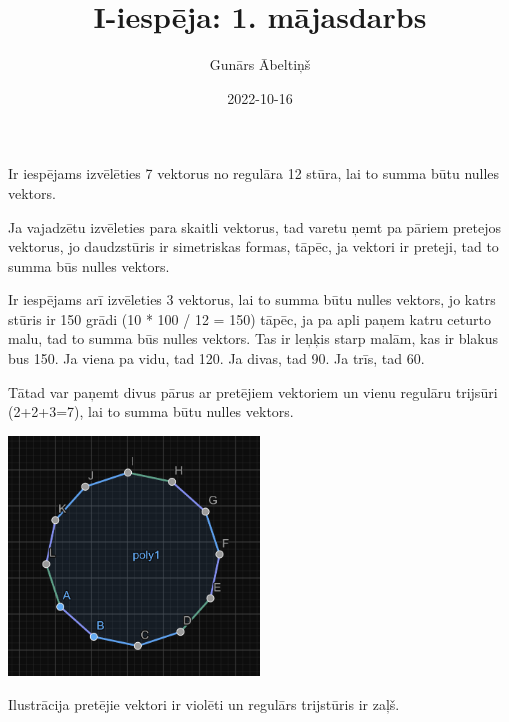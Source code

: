 \documentclass{article}
\title{I-iespēja: 1. mājasdarbs}
\author{Gunārs Ābeltiņš}
\date{2022-10-16}
\begin{document}
\maketitle

Ir iespējams izvēlēties 7 vektorus no regulāra 12 stūra, lai to summa būtu nulles vektors. 

Ja vajadzētu izvēleties para skaitli vektorus, tad varetu ņemt pa pāriem pretejos vektorus, jo daudzstūris ir simetriskas formas, tāpēc, ja vektori ir preteji, tad to summa būs nulles vektors.

Ir iespējams arī izvēleties 3 vektorus, lai to summa būtu nulles vektors, jo katrs stūris ir 150 grādi (10 * 100 / 12 = 150) tāpēc, ja pa apli paņem katru ceturto malu, tad to summa būs nulles vektors. Tas ir leņķis starp malām, kas ir blakus bus 150. Ja viena pa vidu, tad 120. Ja divas, tad 90. Ja trīs, tad 60.

Tātad var paņemt divus pārus ar pretējiem vektoriem un vienu regulāru trijsūri (2+2+3=7), lai to summa būtu nulles vektors.

\includegraphics[width=0.5\textwidth, center]{polygon.png}

Ilustrācija pretējie vektori ir violēti un regulārs trijstūris ir zaļš.
\end{document}
